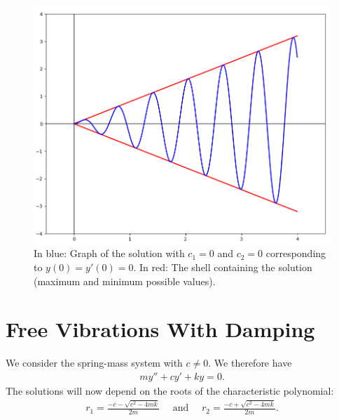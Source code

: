 \documentclass[12pt,a4paper]{article}
\begin{document}
	\begin{figure}[ht]
	\centering
	\includegraphics[scale=0.5]{fig3.png}
	\caption{In blue: Graph of the solution with $c_1 = 0$ and $c_2 = 0$ corresponding to $y(0) = y'(0) = 0$. In red: The shell containing the solution (maximum and minimum possible values).}
	\end{figure}
	
	\newpage
	
	\section{Free Vibrations With Damping}
	We consider the spring-mass system with $c \neq 0$. We therefore have
		\begin{align*}
		my'' + cy' + ky = 0 .
		\end{align*}
	The solutions will now depend on the roots of the characteristic polynomial:
		\begin{align*}
		r_1= \frac{-c - \sqrt{c^2 - 4mk}}{2m} \quad \text{ and } \quad r_2 = \frac{-c + \sqrt{c^2 - 4mk}}{2m} .
		\end{align*}
		
\end{document}
